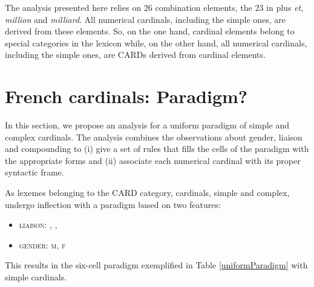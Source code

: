 \documentclass[output=paper]{langsci/langscibook}
\begin{document}
The analysis presented here relies on 26 combination elements, the 23 in  plus \emph{et}, \emph{million} and \emph{milliard}. All numerical cardinals, including the simple ones, are derived from these elements. So, on the one hand, cardinal elements belong to special categories in the lexicon while, on the other hand, all numerical cardinals, including the simple ones, are CARDs derived from cardinal elements.



\section{French cardinals: Paradigm?}\label{Sec3}

In this section, we propose an analysis for a uniform paradigm  of simple and complex cardinals. The analysis combines the observations about gender, liaison  and compounding  to (i) give a set of rules that fills the cells of the paradigm  with the appropriate forms and (ii) associate each numerical cardinal with its proper syntactic frame.

As lexemes belonging to the CARD category,  cardinals, simple and complex, undergo inflection  with a paradigm  based on two features:
\begin{itemize}
\item \textsc{liaison}: \lmoins, \lpause, \lplus
\item \textsc{gender}: \textsc{m, f}
\end{itemize}
This results in the six-cell paradigm  exemplified in Table \ref{uniformParadigm} with simple cardinals.
\end{document}
